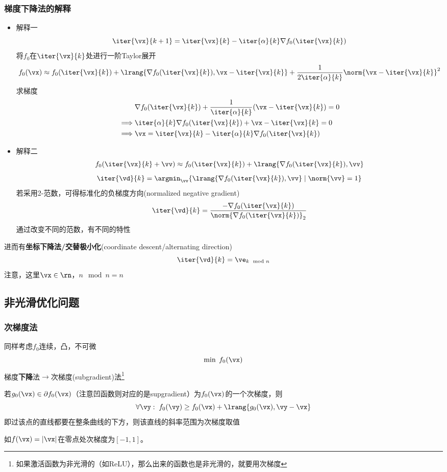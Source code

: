 \subsubsection{梯度下降法的解释}
\begin{itemize}
\item 解释一
\[\iter{\vx}{k+1}=\iter{\vx}{k}-\iter{\alpha}{k}\nabla f_0(\iter{\vx}{k})\]
将$f_0$在$\iter{\vx}{k}$处进行一阶Taylor展开
\[f_0(\vx)\approx f_0(\iter{\vx}{k})+\lrang{\nabla f_0(\iter{\vx}{k}),\vx-\iter{\vx}{k}}+\frac{1}{2\iter{\alpha}{k}}\norm{\vx-\iter{\vx}{k}}^2\]
求梯度
\[\begin{aligned}
    &\nabla f_0(\iter{\vx}{k})+\frac{1}{\iter{\alpha}{k}}(\vx-\iter{\vx}{k})=0\\
    \implies &\iter{\alpha}{k}\nabla f_0(\iter{\vx}{k})+\vx-\iter{\vx}{k}=0\\
    \implies &\vx=\iter{\vx}{k}-\iter{\alpha}{k}\nabla f_0(\iter{\vx}{k})
\end{aligned}\]

\item 解释二
\[f_0(\iter{\vx}{k}+\vv)\approx f_0(\iter{\vx}{k})+\lrang{\nabla f_0(\iter{\vx}{k}),\vv}\]
\[\iter{\vd}{k}=\argmin_\vv\{\lrang{\nabla f_0(\iter{\vx}{k}),\vv}\mid \norm{\vv}=1\}\]
若采用2-范数，可得标准化的负梯度方向(normalized negative gradient)
\[\iter{\vd}{k}=\frac{-\nabla f_0(\iter{\vx}{k})}{\norm{\nabla f_0(\iter{\vx}{k})}_2}\]
通过改变不同的范数，有不同的特性
\end{itemize}

进而有\textbf{坐标下降法/交替极小化}(coordinate descent/alternating direction)
\[\iter{\vd}{k}=\ve_{k \mod n}\]
注意，这里$\vx\in\rn$，$n \mod n = n$


\subsection{非光滑优化问题}
\subsubsection{次梯度法}
同样考虑$f_0$连续，凸，不可微
\[\min\;f_0(\vx)\]
梯度\textbf{下降}法$\to$次梯度(subgradient)法\footnote{如果激活函数为非光滑的（如ReLU），那么出来的函数也是非光滑的，就要用次梯度}
\begin{definition}[次梯度]
若$g_0(\vx)\in\partial f_0(\vx)$（注意凹函数则对应的是supgradient）为$f_0(\vx)$的一个次梯度，则
\[\forall \vy:\;f_0(\vy)\geq f_0(\vx)+\lrang{g_0(\vx),\vy-\vx}\]
即过该点的直线都要在整条曲线的下方，则该直线的斜率范围为次梯度取值
\end{definition}
如$f(\vx)=|\vx|$在零点处次梯度为$[-1,1]$。

